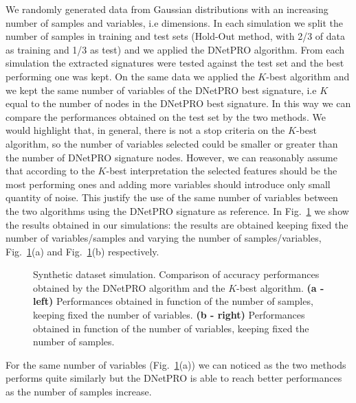 \documentclass{standalone}
\begin{document}
We randomly generated data from Gaussian distributions with an increasing number of samples and variables, i.e dimensions.
In each simulation we split the number of samples in training and test sets (Hold-Out method, with 2/3 of data as training and 1/3 as test) and we applied the \textsf{DNetPRO} algorithm.
From each simulation the extracted signatures were tested against the test set and the best performing one was kept.
On the same data we applied the $K$-best algorithm and we kept the same number of variables of the \textsf{DNetPRO} best signature, i.e $K$ equal to the number of nodes in the \textsf{DNetPRO} best signature.
In this way we can compare the performances obtained on the test set by the two methods.
We would highlight that, in general, there is not a stop criteria on the $K$-best algorithm, so the number of variables selected could be smaller or greater than the number of \textsf{DNetPRO} signature nodes.
However, we can reasonably assume that according to the $K$-best interpretation the selected features should be the most performing ones and adding more variables should introduce only small quantity of noise.
This justify the use of the same number of variables between the two algorithms using the \textsf{DNetPRO} signature as reference.
In Fig.~\ref{fig:dnetpro_toy} we show the results obtained in our simulations: the results are obtained keeping fixed the number of variables/samples and varying the number of samples/variables, Fig.~\ref{fig:dnetpro_toy}(a) and Fig.~\ref{fig:dnetpro_toy}(b) respectively.

\begin{figure}[htbp]
\centering
\def\svgwidth{0.4\textwidth}

\qquad\qquad
\centering
\def\svgwidth{0.4\textwidth}

\caption{Synthetic dataset simulation.
Comparison of accuracy performances obtained by the \textsf{DNetPRO} algorithm and the $K$-best algorithm.
\textbf{(a - left)} Performances obtained in function of the number of samples, keeping fixed the number of variables.
\textbf{(b - right)} Performances obtained in function of the number of variables, keeping fixed the number of samples.
}
\label{fig:dnetpro_toy}
\end{figure}

For the same number of variables (Fig.~\ref{fig:dnetpro_toy}(a)) we can noticed as the two methods performs quite similarly but the \textsf{DNetPRO} is able to reach better performances as the number of samples increase.
\end{document}
